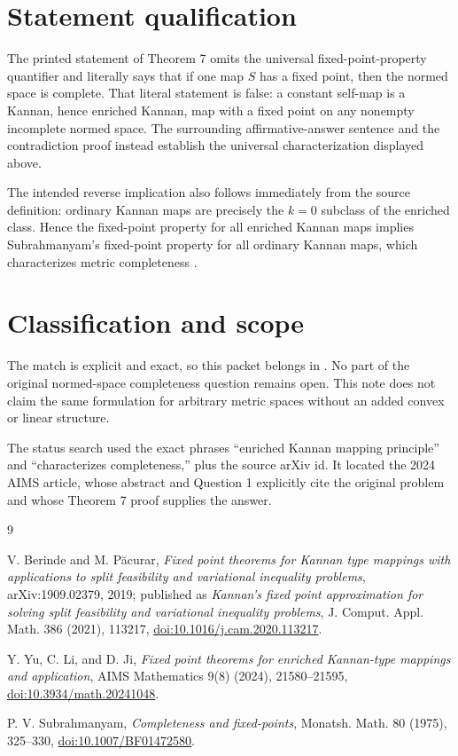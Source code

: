 \documentclass[11pt]{article}
\begin{document}
\section*{Statement qualification}

The printed statement of Theorem 7 omits the universal fixed-point-property
quantifier and literally says that if one map $S$ has a fixed point, then
the normed space is complete. That literal statement is false: a constant
self-map is a Kannan, hence enriched Kannan, map with a fixed point on any
nonempty incomplete normed space. The surrounding affirmative-answer sentence
and the contradiction proof instead establish the universal characterization
displayed above.

The intended reverse implication also follows immediately from the source
definition: ordinary Kannan maps are precisely the $k=0$ subclass of the
enriched class. Hence the fixed-point property for all enriched Kannan maps
implies Subrahmanyam's fixed-point property for all ordinary Kannan maps, which
characterizes metric completeness \cite{Subrahmanyam}.

\section*{Classification and scope}

The match is explicit and exact, so this packet belongs in
. No part of the original
normed-space completeness question remains open. This note does not claim the
same formulation for arbitrary metric spaces without an added convex or
linear structure.

The status search used the exact phrases ``enriched Kannan mapping principle''
and ``characterizes completeness,'' plus the source arXiv id. It located the
2024 AIMS article, whose abstract and Question 1 explicitly cite the original
problem and whose Theorem 7 proof supplies the answer.

\begin{thebibliography}{9}

V. Berinde and M. P\u acurar,
\emph{Fixed point theorems for Kannan type mappings with applications to split
feasibility and variational inequality problems},
arXiv:1909.02379, 2019; published as
\emph{Kannan's fixed point approximation for solving split feasibility and
variational inequality problems}, J. Comput. Appl. Math. 386 (2021), 113217,
\href{https://doi.org/10.1016/j.cam.2020.113217}{doi:10.1016/j.cam.2020.113217}.

Y. Yu, C. Li, and D. Ji,
\emph{Fixed point theorems for enriched Kannan-type mappings and application},
AIMS Mathematics 9(8) (2024), 21580--21595,
\href{https://doi.org/10.3934/math.20241048}{doi:10.3934/math.20241048}.

P. V. Subrahmanyam,
\emph{Completeness and fixed-points},
Monatsh. Math. 80 (1975), 325--330,
\href{https://doi.org/10.1007/BF01472580}{doi:10.1007/BF01472580}.

\end{thebibliography}
\end{document}
